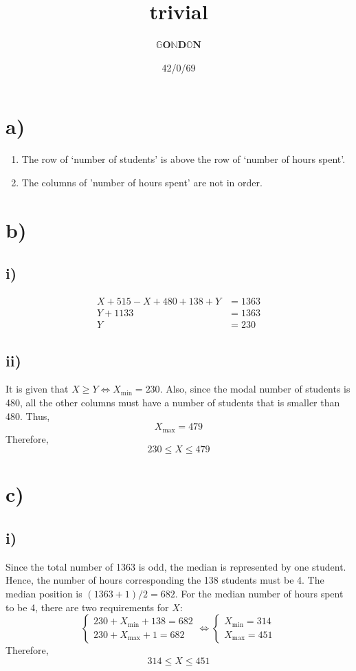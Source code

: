 \documentclass[a4paper]{article}
\title{trivial}
\author{\(\mathbb G\mathbf O\mathbb N \mathbf D\mathbb O\mathbf N\)}
\date{42/0/69}
\begin{document}
\maketitle
\section*{a)}
\begin{enumerate}
    \item The row of `number of students' is above the row of `number of hours spent'.
    \item The columns of 'number of hours spent' are not in order.
\end{enumerate}

\section*{b)}
\subsection*{i)}
\[\begin{aligned}
    X+515-X+480+138+Y&=1363\\
    Y+1133&=1363\\
    Y&=\boxed{230}
\end{aligned}\]

\subsection*{ii)}
It is given that \(X\geqslant Y\iff X_{\min}=230\).
Also, since the modal number of students is 480, all the other columns must have a number of
students that is smaller than 480. Thus,
\[X_{\max}=479\]
Therefore,
\[\boxed{230\leqslant X\leqslant479}\]

\section*{c)}
\subsection*{i)}
Since the total number of 1363 is odd, the median is represented by one student. Hence, the number of hours corresponding the 138 students must be 4. The median position is \((1363+1)/2=682\).
For the median number of hours spent to be 4, there are two requirements for \(X\):
\[\begin{cases}
    230+X_{\min}+138=682\\
    230+X_{\max}+1=682
\end{cases}
\iff
\begin{cases}
    X_{\min}=314\\
    X_{\max}=451
\end{cases}\]
Therefore,
\[\boxed{314\leqslant X\leqslant451}\]
\end{document}
